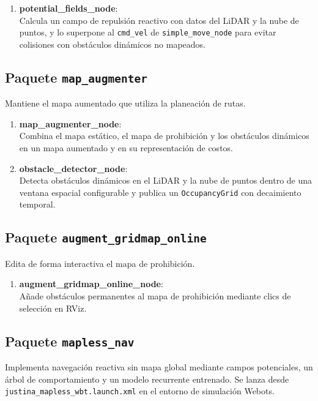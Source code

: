 \begin{enumerate}
    \item \textbf{potential\_fields\_node}: \\
    Calcula un campo de repulsión reactivo con datos del LiDAR y la nube de puntos, y lo superpone al \texttt{cmd\_vel} de \texttt{simple\_move\_node} para evitar colisiones con obstáculos dinámicos no mapeados.
\end{enumerate}

\subsection{Paquete \texttt{map\_augmenter}}
Mantiene el mapa aumentado que utiliza la planeación de rutas.

\begin{enumerate}
    \item \textbf{map\_augmenter\_node}: \\
    Combina el mapa estático, el mapa de prohibición y los obstáculos dinámicos en un mapa aumentado y en su representación de costos.

    \item \textbf{obstacle\_detector\_node}: \\
    Detecta obstáculos dinámicos en el LiDAR y la nube de puntos dentro de una ventana espacial configurable y publica un \texttt{OccupancyGrid} con decaimiento temporal.
\end{enumerate}

\subsection{Paquete \texttt{augment\_gridmap\_online}}
Edita de forma interactiva el mapa de prohibición.

\begin{enumerate}
    \item \textbf{augment\_gridmap\_online\_node}: \\
    Añade obstáculos permanentes al mapa de prohibición mediante clics de selección en RViz.
\end{enumerate}

\subsection{Paquete \texttt{mapless\_nav}}
Implementa navegación reactiva sin mapa global mediante campos potenciales, un árbol de comportamiento y un modelo recurrente entrenado. Se lanza desde \texttt{justina\_mapless\_wbt.launch.xml} en el entorno de simulación Webots.

